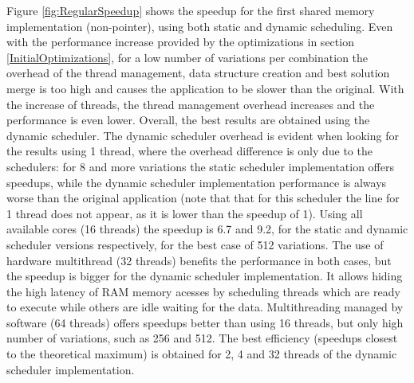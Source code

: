 Figure \ref{fig:RegularSpeedup} shows the speedup for the first shared memory implementation (non-pointer), using both static and dynamic scheduling. Even with the performance increase provided by the optimizations in section \ref{InitialOptimizations}, for a low number of variations per combination the overhead of the thread management, data structure creation and best solution merge is too high and causes the application to be slower than the original. With the increase of threads, the thread management overhead increases and the performance is even lower. Overall, the best results are obtained using the dynamic scheduler. The dynamic scheduler overhead is evident when looking for the results using 1 thread, where the overhead difference is only due to the schedulers: for 8 and more variations the static scheduler implementation offers speedups, while the dynamic scheduler implementation performance is always worse than the original application (note that that for this scheduler the line for 1 thread does not appear, as it is lower than the speedup of 1). Using all available cores (16 threads) the speedup is 6.7 and 9.2, for the static and dynamic scheduler versions respectively, for the best case of 512 variations. The use of hardware multithread (32 threads) benefits the performance in both cases, but the speedup is bigger for the dynamic scheduler implementation. It allows hiding the high latency of RAM memory acesses by scheduling threads which are ready to execute while others are idle waiting for the data. Multithreading managed by software (64 threads) offers speedups better than using 16 threads, but only high number of variations, such as 256 and 512. The best efficiency (speedups closest to the theoretical maximum) is obtained for 2, 4 and 32 threads of the dynamic scheduler implementation.

